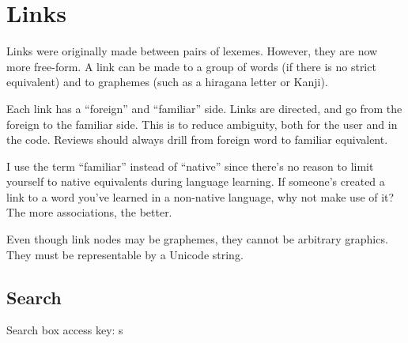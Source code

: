 \chapter{Links}

Links were originally made between pairs of lexemes. However, they are now more
free-form. A link can be made to a group of words (if there is no strict
equivalent) and to graphemes (such as a hiragana letter or Kanji).

Each link has a ``foreign'' and ``familiar'' side. Links are directed, and go
from the foreign to the familiar side. This is to reduce ambiguity, both for
the user and in the code. Reviews should always drill from foreign word to
familiar equivalent.

I use the term ``familiar'' instead of ``native'' since there's no reason to
limit yourself to native equivalents during language learning. If someone's
created a link to a word you've learned in a non-native language, why not make
use of it? The more associations, the better.

Even though link nodes may be graphemes, they cannot be arbitrary graphics.
They must be representable by a Unicode string.

\section{Search}

Search box access key: s